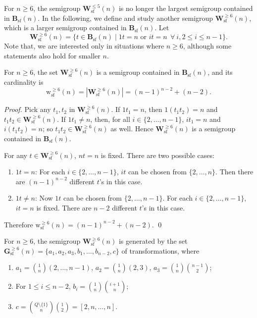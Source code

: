 \documentclass{llncs}
\renewcommand{\le}{\leqslant}
\renewcommand{\ge}{\geqslant}
\newcommand{\be}{\begin{enumerate}}
\newcommand{\ee}{\end{enumerate}}
\newcommand{\txt}[1]{\mbox{ #1 }}
\newcommand{\Bsf}{\mathbf{B}_{\mathrm{sf}}}
\newcommand{\Vsf}{\mathbf{W}^{\le 5}_{\mathrm{sf}}}
\newcommand{\Wsf}{\mathbf{W}^{\ge 6}_{\mathrm{sf}}}
\newcommand{\Hsf}{\mathbf{G}^{\ge 6}_{\mathrm{sf}}}
\newcommand{\wsf}{{\mathrm{w}^{\ge 6}_{\mathrm{sf}}}}
\begin{document}
For $n \ge 6$, the semigroup $\Vsf(n)$ is no longer the largest semigroup contained in $\Bsf(n)$. In the following, we define and study another semigroup $\Wsf(n)$, which is a larger semigroup contained in $\Bsf(n)$. Let 
$$\Wsf(n) = \{ t \in \Bsf(n) \mid 1t = n \txt{or} it = n~~\forall~i, 2 \le i \le n-1 \}.$$ 
Note that, we are interested only in situations where $n \ge 6$, although some statements also hold for smaller $n$. 


\begin{proposition}\label{prop:Wsf} 
For $n \ge 6$, the set $\Wsf(n)$ is a semigroup contained in $\Bsf(n)$, and its cardinality is 
$$\wsf(n) = |\Wsf(n)| = (n-1)^{n-2} + (n-2).$$
\end{proposition}

\begin{proof} 
Pick any $t_1,t_2$ in $\Wsf(n)$. If $1t_1 = n$, then $1(t_1t_2) = n$ and $t_1t_2 \in \Wsf(n)$. If $1t_1 \neq n$, then, for all $i \in \{2,\ldots,n-1\}$, $it_1 = n$ and $i(t_1t_2) = n$; so $t_1t_2 \in \Wsf(n)$ as well. Hence $\Wsf(n)$ is a semigroup contained in $\Bsf(n)$. 

For any $t \in \Wsf(n)$, $nt = n$ is fixed. There are two possible cases: 
\be
\item $1t = n$: For each $i \in \{2,\ldots,n-1\}$, $it$ can be chosen from $\{2,\ldots,n\}$. Then there are $(n-1)^{n-2}$ different $t$'s in this case. 
\item $1t \neq n$: Now $1t$ can be chosen from $\{2,\ldots,n-1\}$. For each $i \in \{2,\ldots,n-1\}$, $it = n$ is fixed. There are $n-2$ different $t$'s in this case. 
\ee
Therefore $\wsf(n) = (n-1)^{n-2} + (n-2)$. \qed
\end{proof}



\begin{proposition}\label{prop:Wsfgen} 
For $n \ge 6$, the semigroup $\Wsf(n)$ is generated by the set $\Hsf(n) = \{a_1,a_2,a_3,b_1,\ldots,b_{n-2},c\}$ of transformations, where 
\be 
\item $a_1 = {1 \choose n}(2,\ldots,n-1)$, $a_2 = {1 \choose n}(2,3)$, $a_3 = {1 \choose n}{n-1 \choose 2}$; 
\item For $1 \le i \le n-2$, $b_i = {1 \choose n}{i+1 \choose n}$; 
\item $c = {Q \setminus \{1\} \choose n}{1 \choose 2} = [2,n,\ldots,n]$. 
\ee 
\end{proposition}
\end{document}
